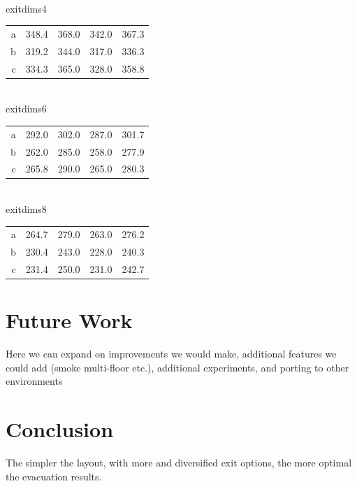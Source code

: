 \documentclass[12pt,letterpaper]{article}
\begin{document}
\\
exitdims4
\begin{tabular}{ r | r | r | r | r }
a & 348.4 & 368.0 & 342.0 & 367.3 \\
b & 319.2 & 344.0 & 317.0 & 336.3 \\
c & 334.3 & 365.0 & 328.0 & 358.8 \\
\end{tabular}
\\
exitdims6
\begin{tabular}{ r | r | r | r | r }
a & 292.0 & 302.0 & 287.0 & 301.7 \\
b & 262.0 & 285.0 & 258.0 & 277.9 \\
c & 265.8 & 290.0 & 265.0 & 280.3 \\
\end{tabular}
\\
exitdims8
\begin{tabular}{ r | r | r | r | r }
a& 264.7& 279.0& 263.0& 276.2 \\
b& 230.4& 243.0& 228.0& 240.3 \\
c& 231.4& 250.0& 231.0& 242.7 \\
\end{tabular}

\section{Future Work}
Here we can expand on improvements we would make, additional features we could add (smoke multi-floor etc.), additional experiments, and porting to other environments
\section {Conclusion}

The simpler the layout, with more and diversified exit options, the more optimal
the evacuation results.




\end{document}
